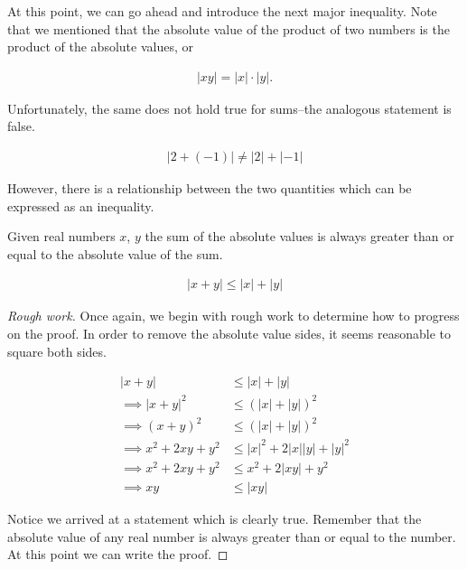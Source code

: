 \documentclass[twoside]{report}
\begin{document}
At this point, we can go ahead and introduce the next major inequality. Note that we mentioned that the absolute value of the product of two numbers is the product of the absolute values, or

\begin{align*}
	|xy| = |x| \cdot |y|.
\end{align*}

Unfortunately, the same does not hold true for sums--the analogous statement is false.

\begin{align*}
	|2 + (-1)| \neq |2| + |-1|
\end{align*}

However, there is a relationship between the two quantities which can be expressed as an inequality. \\

\begin{theorem}
	Given real numbers $x$, $y$ the sum of the absolute values is always greater than or equal to the absolute value of the sum.
	
	\begin{align}
		|x + y| \le |x| + |y|
	\end{align}
\end{theorem}

\begin{proof}[Rough work]\let\qed\relax
	Once again, we begin with rough work to determine how to progress on the proof. In order to remove the absolute value sides, it seems reasonable to square both sides.
	
	\begin{align*}
		|x + y| &\le |x| + |y| \\
		\implies |x + y|^2 &\le (|x| + |y|)^2 \\
		\implies (x + y)^2 &\le (|x| + |y|)^2 \\
		\implies x^2 + 2xy + y^2 &\le |x|^2 + 2|x||y| + |y|^2 \\
		\implies x^2 + 2xy + y^2 &\le x^2 + 2|xy| + y^2 \\
		\implies xy &\le |xy|
	\end{align*}
	
	Notice we arrived at a statement which is clearly true. Remember that the absolute value of any real number is always greater than or equal to the number. At this point we can write the proof.
\end{proof}
\end{document}

